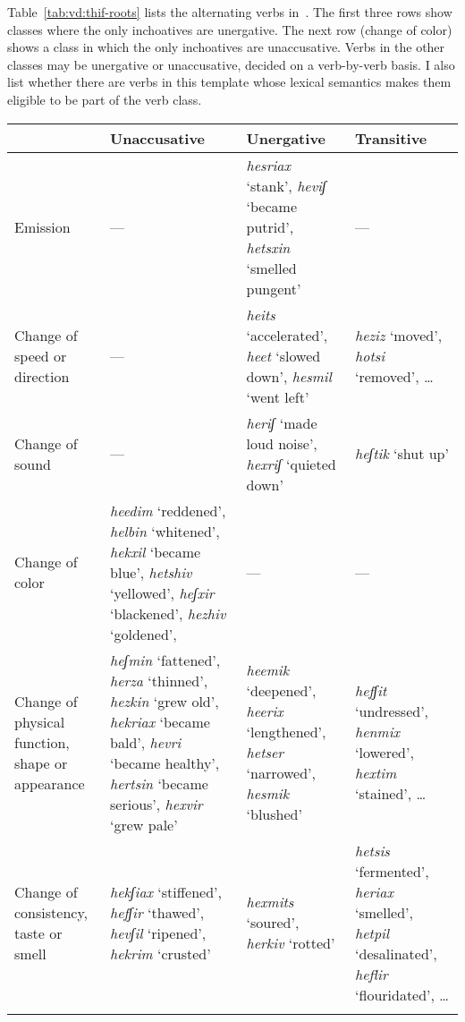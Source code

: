 \begin{exe}
\begin{xlist}
\begin{xlist}
\begin{exe}
\begin{exe}
\begin{xlist}
\begin{exe}
\begin{xlist}
\begin{exe}
\begin{xlist}
\begin{xlist}
Table~\ref{tab:vd:thif-roots} lists the alternating verbs in~{\thif}. The first three rows show classes where the only inchoatives are unergative. The next row (change of color) shows a class in which the only inchoatives are unaccusative. Verbs in the other classes may be unergative or unaccusative, decided on a verb-by-verb basis. I also list whether there are  verbs in this template whose lexical semantics makes them eligible to be part of the verb class.

\begin{table} \small
	\begin{tabularx}{\textwidth}{L{2cm}L{3.5cm}L{3cm}L{2.5cm}}
 \lsptoprule
		&	\textbf{Unaccusative}	&  \textbf{Unergative} & \textbf{Transitive} \\\midrule
	Emission & --- & \emph{hesriax} `stank', \emph{heviʃ} `became putrid', \emph{hetsxin} `smelled pungent'\footnotemark & --- \\
	
	Change of speed or direction & --- & \emph{heits} `accelerated', \emph{heet} `slowed down', \emph{hesmil} `went left' & \emph{heziz} `moved', \emph{hotsi} `removed', \dots \\
	
	Change of sound & --- & \emph{heriʃ} `made loud noise', \emph{hexriʃ} `quieted down' & \emph{heʃtik} `shut up' \\\tablevspace
	
	Change of color & \emph{heedim} `reddened', \emph{helbin} `whitened', \emph{hekxil} `became blue', \emph{he{ts}hiv} `yellowed', \emph{heʃxir} `blackened', \emph{hezhiv} `goldened', 
				& --- & --- \\\tablevspace
		
	Change of physical function, shape or appearance & \emph{heʃmin} `fattened', \emph{herza} `thinned', \emph{hezkin} `grew old', \emph{hekriax} `became bald', \emph{hevri} `became healthy', \emph{her{ts}in} `became serious', \emph{hexvir} `grew pale' &
		\emph{heemik} `deepened', \emph{heerix} `lengthened', \emph{he{ts}er} `narrowed', \emph{hesmik} `blushed' & \emph{hefʃit} `undressed', \emph{henmix} `lowered', \emph{hextim} `stained', \dots \\

	Change of consistency, taste or smell & \emph{hekʃiax} `stiffened', \emph{hefʃir} `thawed', \emph{hevʃil} `ripened', \emph{hekrim} `crusted'
		& \emph{hexmits} `soured', \emph{herkiv} `rotted'
		& \emph{hetsis} `fermented', \emph{heriax} `smelled', \emph{hetpil} `desalinated', \emph{heflir} `flouridated', \dots \\\tablevspace
		

\end{tabularx}
\end{table}
\end{xlist}
\end{xlist}
\end{exe}
\end{xlist}
\end{exe}
\end{xlist}
\end{exe}
\end{exe}
\end{xlist}
\end{xlist}
\end{exe}

